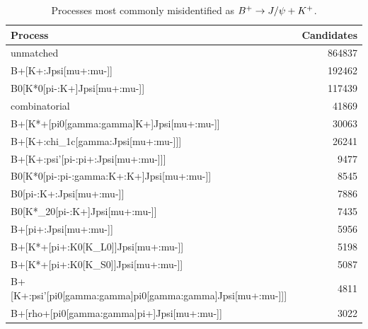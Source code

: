 \begin{table}
    \centering
    \begin{tabular}{| l | r |}
	\hline
	Process                                           &     Candidates\\
	\hline
	unmatched                                         &         864837\\
	B+[K+:Jpsi[mu+:mu-]]                              &         192462\\
	B0[K*0[pi-:K+]Jpsi[mu+:mu-]]                      &         117439\\
	combinatorial                                              &          41869\\
	B+[K*+[pi0[gamma:gamma]K+]Jpsi[mu+:mu-]]          &          30063\\
	B+[K+:chi\_1c[gamma:Jpsi[mu+:mu-]]]                &         26241\\
	B+[K+:psi'[pi-:pi+:Jpsi[mu+:mu-]]]                &           9477\\
	B0[K*0[pi-:pi-:gamma:K+:K+]Jpsi[mu+:mu-]]         &           8545\\
	B0[pi-:K+:Jpsi[mu+:mu-]]                          &           7886\\
	B0[K*\_20[pi-:K+]Jpsi[mu+:mu-]]                    &          7435\\
	B+[pi+:Jpsi[mu+:mu-]]                             &           5956\\
	B+[K*+[pi+:K0[K\_L0]]Jpsi[mu+:mu-]]                &          5198\\
	B+[K*+[pi+:K0[K\_S0]]Jpsi[mu+:mu-]]                &          5087\\
	B+[K+:psi'[pi0[gamma:gamma]pi0[gamma:gamma]Jpsi[mu+:mu-]]]&   4811\\
	B+[rho+[pi0[gamma:gamma]pi+]Jpsi[mu+:mu-]]        &           3022\\
	\hline
    \end{tabular}
    \caption{Processes most commonly misidentified as $B^{+}\rightarrow J/\psi+K^{+}$.}
    \label{tab:bpjpsik_decays}
\end{table}

